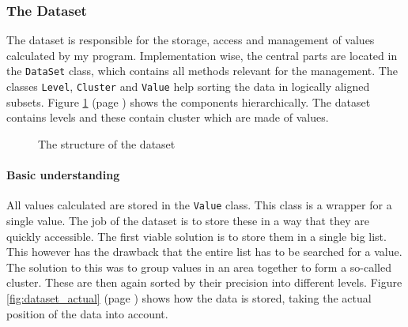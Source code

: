 \documentclass[10pt,a4paper,titlepage]{article}
\begin{document}
	\subsubsection{The Dataset}
	The dataset is responsible for the storage, access and management of values calculated by my program. Implementation wise, the central parts are located in the \verb|DataSet| class, which contains all methods relevant for the management. The classes \verb|Level|, \verb|Cluster| and \verb|Value| help sorting the data in logically aligned subsets. Figure \ref{fig:dataset_hierarchy} (page \pageref{fig:dataset_hierarchy}) shows the components hierarchically. The dataset contains levels and these contain cluster which are made of values.
	
	\begin{figure}
		\centering
		\caption{The structure of the dataset}
		\label{fig:dataset_hierarchy}
	\end{figure}
	\paragraph{Basic understanding}
	All values calculated are stored in the \verb|Value| class. This class is a wrapper for a single value. The job of the dataset is to store these in a way that they are quickly accessible. The first viable solution is to store them in a single big list. This however has the drawback that the entire list has to be searched for a value. The solution to this was to group values in an area together to form a so-called cluster. These are then again sorted by their precision into different levels. Figure \ref{fig:dataset_actual} (page \pageref{fig:dataset_actual}) shows how the data is stored, taking the actual position of the data into account. 
	
\end{document}
